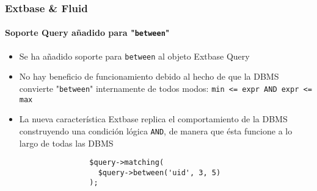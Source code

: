 
\begin{frame}[fragile]
	\frametitle{Extbase \& Fluid}
	\framesubtitle{Soporte Query añadido para "\texttt{between}"}

	\begin{itemize}

		\item Se ha añadido soporte para \texttt{between} al objeto Extbase Query

		\item No hay beneficio de funcionamiento debido al hecho de que la DBMS convierte
			"\texttt{between}" internamente de todos modos: \texttt{min <= expr AND expr <= max}

		\item La nueva característica Extbase replica el comportamiento de la DBMS construyendo una
			condición lógica \texttt{AND}, de manera que ésta funcione a lo largo de todas las DBMS

			\begin{lstlisting}
				$query->matching(
				  $query->between('uid', 3, 5)
				);
			\end{lstlisting}

	\end{itemize}

\end{frame}


